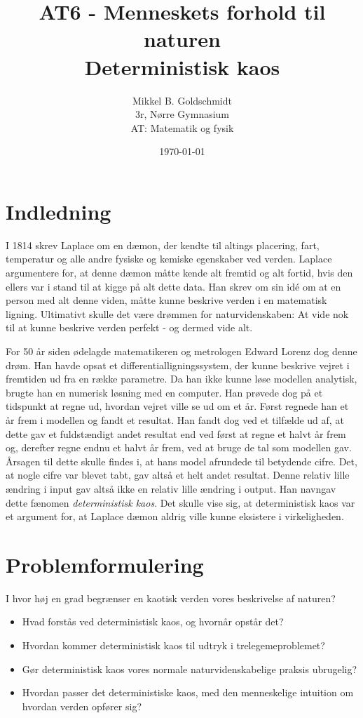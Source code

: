 \documentclass[12pt,a4paper]{article}
\author{Mikkel B. Goldschmidt\\ 3r, Nørre Gymnasium \\ AT: Matematik og fysik}
\title{AT6 - Menneskets forhold til naturen \\ Deterministisk kaos}
\date{\today}
\theoremstyle{break}
\theoremstyle{nonumberplain}
\begin{document}


\maketitle

\section{Indledning}
I 1814 skrev Laplace om en dæmon, der kendte til altings placering, fart, temperatur og alle andre fysiske og kemiske egenskaber ved verden.
Laplace argumentere for, at denne dæmon måtte kende alt fremtid og alt fortid, hvis den ellers var i stand til at kigge på alt dette data. 
Han skrev om sin idé om at en person med alt denne viden, måtte kunne beskrive verden i en matematisk ligning. 
Ultimativt skulle det være drømmen for naturvidenskaben: At vide nok til at kunne beskrive verden perfekt - og dermed vide alt.

For 50 år siden ødelagde matematikeren og metrologen Edward Lorenz dog denne drøm. 
Han havde opsat et differentialligningssystem, der kunne beskrive vejret i fremtiden ud fra en række parametre. 
Da han ikke kunne løse modellen analytisk, brugte han en numerisk løsning med en computer. 
Han prøvede dog på et tidspunkt at regne ud, hvordan vejret ville se ud om et år. 
Først regnede han et år frem i modellen og fandt et resultat. 
Han fandt dog ved et tilfælde ud af, at dette gav et fuldstændigt andet resultat end ved først at regne et halvt år frem og, derefter  regne endnu et halvt år frem, ved at bruge de tal som modellen gav. 
Årsagen til dette skulle findes i, at hans model afrundede til betydende cifre. 
Det, at nogle cifre var blevet tabt, gav altså et helt andet resultat. 
Denne relativ lille ændring i input gav altså ikke en relativ lille ændring i output. 
Han navngav dette fænomen \textit{deterministisk kaos}.
Det skulle vise sig, at deterministisk kaos var et argument for, at Laplace dæmon aldrig ville kunne eksistere i virkeligheden.

\section{Problemformulering}
I hvor høj en grad begrænser en kaotisk verden vores beskrivelse af naturen?

\begin{itemize}
\item Hvad forstås ved deterministisk kaos, og hvornår opstår det?
\item Hvordan kommer deterministisk kaos til udtryk i trelegemeproblemet?
\item Gør deterministisk kaos vores normale naturvidenskabelige praksis ubrugelig?
\item Hvordan passer det deterministiske kaos, med den menneskelige intuition om hvordan verden opfører sig?
\end{itemize}
\end{document}
